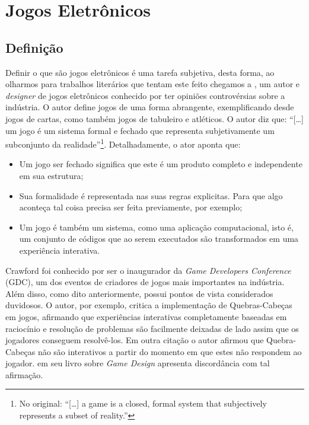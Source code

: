 \section{Jogos Eletrônicos}

\subsection{Definição}
Definir o que são jogos eletrônicos é uma tarefa subjetiva, desta forma, ao olharmos para trabalhos literários que tentam este feito chegamos a , um autor e \textit{designer} de jogos eletrônicos conhecido por ter opiniões controvérsias sobre a indústria. O autor define jogos de uma forma abrangente, exemplificando desde jogos de cartas, como também jogos de tabuleiro e atléticos. O autor diz que: ``[\dots] um jogo é um sistema formal e fechado que representa subjetivamente um subconjunto da realidade''\cite[p. 4, tradução nossa]{Crawford1984}\footnote{No original: ``[\dots] a game is a closed, formal system that subjectively represents a subset of reality.''}. Detalhadamente, o ator aponta que:
\begin{itemize}
\item Um jogo ser fechado significa que este é um produto completo e independente em sua estrutura;
\item Sua formalidade é representada nas suas regras explicitas. Para que algo aconteça tal coisa precisa ser feita previamente, por exemplo;
\item Um jogo é também um sistema, como uma aplicação computacional, isto é, um conjunto de códigos que ao serem executados são transformados em uma experiência interativa.
\end{itemize}

Crawford foi conhecido por ser o inaugurador da \textit{Game Developers Conference} (GDC), um dos eventos de criadores de jogos mais importantes na indústria. Além disso, como dito anteriormente, possui pontos de vista considerados duvidosos. O autor, por exemplo, critica a implementação de Quebras-Cabeças em jogos, afirmando que experiências interativas completamente baseadas em raciocínio e resolução de problemas são facilmente deixadas de lado assim que os jogadores conseguem resolvê-los. Em outra citação o autor afirmou que Quebra-Cabeças não são interativos a partir do momento em que estes não respondem ao jogador.  em seu livro sobre \textit{Game Design} apresenta discordância com tal afirmação. 

